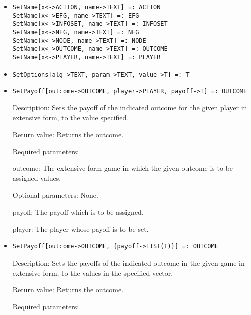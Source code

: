 \begin{itemize}
\item
\protect \large \begin{verbatim}
SetName[x<->ACTION, name->TEXT] =: ACTION
SetName[x<->EFG, name->TEXT] =: EFG
SetName[x<->INFOSET, name->TEXT] =: INFOSET
SetName[x<->NFG, name->TEXT] =: NFG
SetName[x<->NODE, name->TEXT] =: NODE
SetName[x<->OUTCOME, name->TEXT] =: OUTCOME
SetName[x<->PLAYER, name->TEXT] =: PLAYER
\end{verbatim}\normalsize

\item
\protect \large \begin{verbatim}
SetOptions[alg->TEXT, param->TEXT, value->T] =: T
\end{verbatim}\normalsize

\item
\protect \large \begin{verbatim}
SetPayoff[outcome->OUTCOME, player->PLAYER, payoff->T] =: OUTCOME
\end{verbatim}\normalsize

\bd
\item
[Description:] Sets the payoff  of the indicated outcome for the given
player in extensive form, to the value specified.
\item
[Return value:] Returns the outcome.
\item
[Required parameters:]\hfil\null
	
\bd
\item
[outcome:] The extensive form game in which the given outcome is to be
assigned values.
\ed

\item
[Optional parameters:] None.
\bd
\item
[payoff:] The payoff which is to be assigned.
\item
[player:] The player whose payoff is to be set.  
\ed
\ed

\item
\protect \large \begin{verbatim}
SetPayoff[outcome->OUTCOME, {payoff->LIST(T)}] =: OUTCOME
\end{verbatim}\normalsize

\bd
\item
[Description:] Sets the payoffs  of the indicated outcome in the given
game in extensive form, to the values in the specified vector.
\item
[Return value:] Returns the outcome.
\item
[Required parameters:]\hfil\null
	

\end{itemize}
